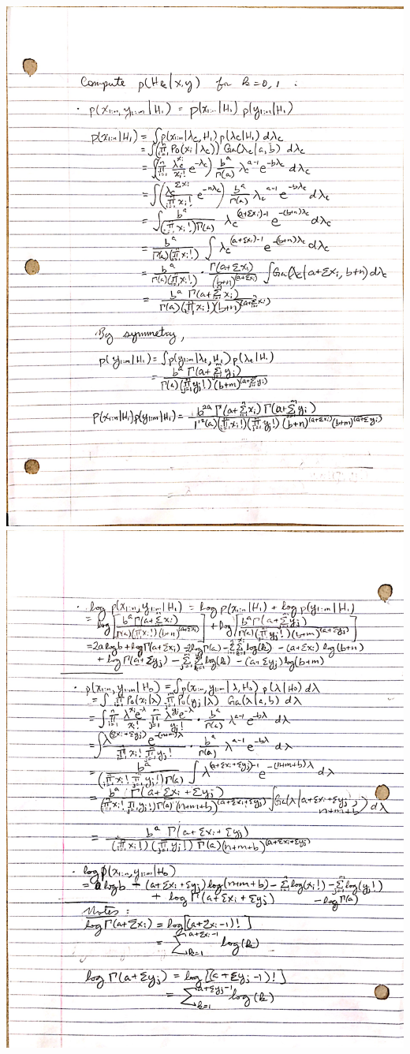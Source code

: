 \documentclass{article}
\begin{document}
\appendix
\includegraphics[scale = 0.23]{page1.jpg} \\
\includegraphics[scale = 0.23]{page2.jpg} \\
\end{document}
